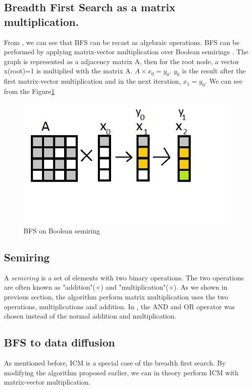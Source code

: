 \subsection{Breadth First Search as a matrix multiplication.} \label{BFS as Matrix}
From  \cite{AlgoToMath}, we can see that BFS can be recast as algebraic operations. BFS can be performed by applying matrix-vector multiplication over Boolean semirings \cite{HybridBFS2015}. The graph is represented as a adjacency matrix A, then for the root node, a vector x(root)=1 is multiplied with the matrix A. $A \times x_0 = y_0$. $y_0$ is the result after the first matrix-vector multiplication and in the next iteration, $x_1 = y_0$. We can see from the Figure\ref{fig:bfsMatrix}

\begin{figure}
	
	\includegraphics[width=\textwidth]{Figures/BFS_algo}
	\caption{BFS on Boolean semiring}
	\label{fig:bfsMatrix}
\end{figure}
\subsection{Semiring}
A $semiring$ is a set of elements with two binary operations. The two operations are often known as "addition"(+) and "multiplication"($\times$).  As we shown in previous section, the algorithm perform matrix multiplication uses the two operations, multiplications and addition. In  \cite{HybridBFS2015}, the AND and OR operator was chosen instead of the normal addition and multiplication. 


\subsection{BFS to data diffusion}
As mentioned before, ICM is a special case of the breadth first search. By modifying the algorithm proposed earlier, we can in theory perform ICM with matrix-vector multiplication.  

